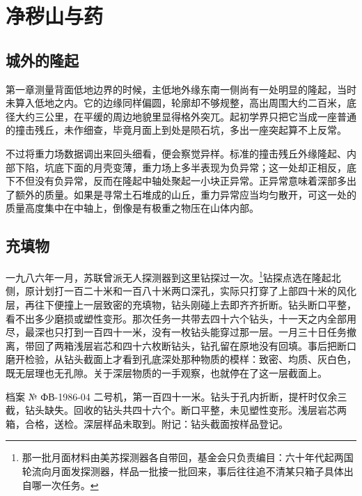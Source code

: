 \chapter{净秽山与药}


\section{城外的隆起}

第一章测量背面低地边界的时候，主低地外缘东南一侧尚有一处明显的隆起，当时未算入低地之内。它的边缘同样偏圆，轮廓却不够规整，高出周围大约二百米，底径大约三公里，在平缓的周边地貌里显得格外突兀。起初学界只把它当成一座普通的撞击残丘，未作细查，毕竟月面上到处是陨石坑，多出一座突起算不上反常。

不过将重力场数据调出来回头细看，便会察觉异样。标准的撞击残丘外缘隆起、内部下陷，坑底下面的月壳变薄，重力场上多半表现为负异常；这一处却正相反，底下不但没有负异常，反而在隆起中轴处聚起一小块正异常。正异常意味着深部多出了额外的质量。如果是寻常土石堆成的山丘，重力异常应当均匀散开，可这一处的质量高度集中在中轴上，倒像是有极重之物压在山体内部。

\section{充填物}

一九八六年一月，苏联曾派无人探测器到这里钻探过一次。\footnote{那一批月面材料由美苏探测器各自带回，基金会只负责编目：六十年代起两国轮流向月面发探测器，样品一批接一批回来，事后往往追不清某只箱子具体出自哪一次任务。}钻探点选在隆起北侧，原计划打一百二十米和一百八十米两口深孔，实际只打穿了上部四十米的风化层，再往下便撞上一层致密的充填物，钻头刚碰上去即齐齐折断。钻头断口平整，看不出多少磨损或塑性变形。那次任务一共带去四十六个钻头，十一天之内全部用尽，最深也只打到一百四十一米，没有一枚钻头能穿过那一层。一月三十日任务撤离，带回了两箱浅层岩芯和四十六枚断钻头，钻孔留在原地没有回填。事后把断口磨开检验，从钻头截面上才看到孔底深处那种物质的模样：致密、均质、灰白色，既无层理也无孔隙。关于深层物质的一手观察，也就停在了这一层截面上。

\begin{archive}[内部参考]{档案 № ФВ-1986-04}
二号机，第一百四十一米。钻头于孔内折断，提杆时仅余三截，钻头缺失。回收的钻头共四十六个。断口平整，未见塑性变形。浅层岩芯两箱，合格，送检。深层样品未取到。附记：钻头截面按样品登记。
\end{archive}

